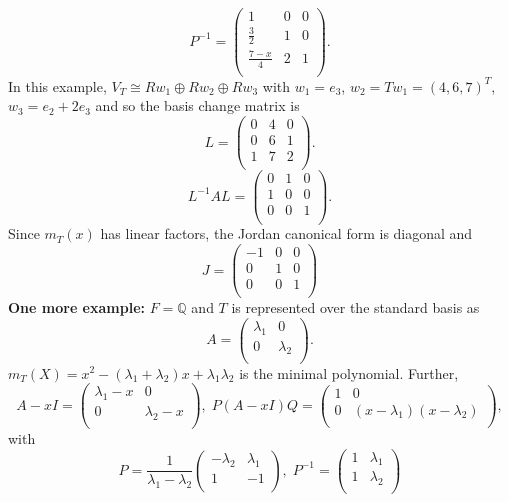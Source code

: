 $$
P^{-1} =
\left(
\begin{array}{ccc}
1 & 0 & 0\\
{\frac 3 2} & 1 & 0\\
{\frac {7-x} 4}  & 2& 1\\
\end{array}
\right).
$$
In this example, $V_T \cong R w_1 \oplus Rw_2 \oplus Rw_3$ with $w_1= e_3$, $w_2=Tw_1 = (4,6,7)^T$,
$w_3 = e_2+2 e_3$ and so the basis change matrix is
$$
L =
\left(
\begin{array}{ccc}
0 & 4 & 0\\
0 & 6 & 1\\
1  & 7 & 2\\
\end{array}
\right).
$$
$$
L^{-1}AL =
\left(
\begin{array}{ccc}
0 & 1 & 0\\
1 & 0 & 0\\
0  & 0 & 1\\
\end{array}
\right).
$$
Since $m_T(x)$ has linear factors, the Jordan canonical form is diagonal and
$$
J =
\left(
\begin{array}{ccc}
-1 & 0 & 0\\
0 & 1 & 0\\
0  & 0 & 1\\
\end{array}
\right)
$$
{\bf One more example:} $F = \mathbb{Q}$ and $T$ is represented over the standard basis as
$$
A =
\left(
\begin{array}{cc}
\lambda_1 & 0\\
0 & \lambda_2 \\
\end{array}
\right).
$$
$m_T(X)= x^2 -(\lambda_1 + \lambda_2) x + \lambda_1 \lambda_2$ is the minimal polynomial.  Further,
$$
A-xI = 
\left(
\begin{array}{cc}
\lambda_1  - x& 0\\
0 & \lambda_2 - x\\
\end{array}
\right), \;
P(A-xI)Q = 
\left(
\begin{array}{cc}
1 & 0\\
0 & (x - \lambda_1) (x - \lambda_2)\\
\end{array}
\right),
$$
with
$$
P =
{\frac 1 {\lambda_1 - \lambda_2}}
\left(
\begin{array}{cc}
- \lambda_2 & \lambda_1\\
1 & -1\\
\end{array}
\right), \;
P^{-1}=
\left(
\begin{array}{cc}
1 & \lambda_1\\
1 & \lambda_2\\
\end{array}
\right)
$$
